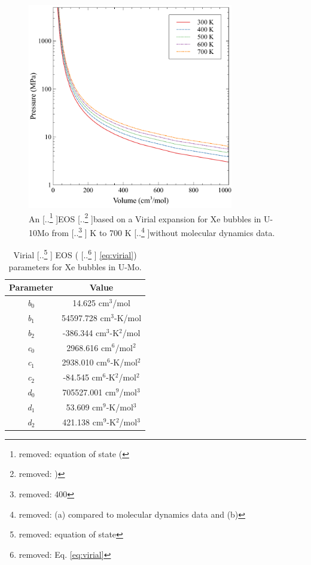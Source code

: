 \documentclass[review]{elsarticle}
\providecommand{\DIFaddtex}[1]{{\protect\color{blue} \sf #1}} %
\providecommand{\DIFdeltex}[1]{{\protect\color{red} [..\footnote{removed: #1} ]}} %
\providecommand{\DIFaddFL}[1]{\DIFadd{#1}} %
\providecommand{\DIFdelFL}[1]{\DIFdel{#1}} %
\providecommand{\DIFaddbeginFL}{} %
\providecommand{\DIFaddendFL}{} %
\providecommand{\DIFdelbeginFL}{} %
\providecommand{\DIFdelendFL}{} %
\providecommand{\DIFadd}[1]{\texorpdfstring{\DIFaddtex{#1}}{#1}} %
\providecommand{\DIFdel}[1]{\texorpdfstring{\DIFdeltex{#1}}{}} %
\newcommand{\DIFscaledelfig}{0.5}
\newlength{\DIFdelgraphicswidth} %
\newlength{\DIFdelgraphicsheight} %
\newcommand{\DIFaddincludegraphics}[2][]{{\color{blue}\fbox{\DIFOincludegraphics[#1]{#2}}}} %
\newcommand{\DIFdelincludegraphics}[2][]{%
\sbox{\DIFdelgraphicsbox}{\DIFOincludegraphics[#1]{#2}}%
\settoboxwidth{\DIFdelgraphicswidth}{\DIFdelgraphicsbox} %
\settoboxtotalheight{\DIFdelgraphicsheight}{\DIFdelgraphicsbox} %
\scalebox{\DIFscaledelfig}{%
\parbox[b]{\DIFdelgraphicswidth}{\usebox{\DIFdelgraphicsbox}\\[-\baselineskip] \rule{\DIFdelgraphicswidth}{0em}}\llap{\resizebox{\DIFdelgraphicswidth}{\DIFdelgraphicsheight}{%
\setlength{\unitlength}{\DIFdelgraphicswidth}%
\begin{picture}(1,1)%
\thicklines\linethickness{2pt} %
{\color[rgb]{1,0,0}\put(0,0){\framebox(1,1){}}}%
{\color[rgb]{1,0,0}\put(0,0){\line( 1,1){1}}}%
{\color[rgb]{1,0,0}\put(0,1){\line(1,-1){1}}}%
\end{picture}%
}\hspace*{3pt}}} %
} %
\DeclareRobustCommand{\DIFaddbeginFL}{\DIFOaddbeginFL \let\includegraphics\DIFaddincludegraphics} %
\DeclareRobustCommand{\DIFaddendFL}{\DIFOaddendFL \let\includegraphics\DIFOincludegraphics} %
\DeclareRobustCommand{\DIFdelbeginFL}{\DIFOdelbeginFL \let\includegraphics\DIFdelincludegraphics} %
\DeclareRobustCommand{\DIFdelendFL}{\DIFOaddendFL \let\includegraphics\DIFOincludegraphics} %
\begin{document}
\begin{figure}[h!]
 \centering
 \DIFdelbeginFL %
\DIFdelendFL \DIFaddbeginFL \includegraphics[width=0.8\textwidth]{virial_fit} 
 \DIFaddendFL \caption{An \DIFdelbeginFL \DIFdelFL{equation of state (}\DIFdelendFL EOS \DIFdelbeginFL \DIFdelFL{) }\DIFdelendFL based on a Virial expansion for Xe bubbles in U-10Mo from \DIFdelbeginFL \DIFdelFL{400 }\DIFdelendFL \DIFaddbeginFL \DIFaddFL{300 }\DIFaddendFL K to 700 K \DIFdelbeginFL \DIFdelFL{(a) compared to molecular dynamics data and (b) }\DIFdelendFL without molecular dynamics data. }
 \label{fig:Vir}
\end{figure}

\begin{table}[h!]
\caption{Virial \DIFdelbeginFL \DIFdelFL{equation of state }\DIFdelendFL \DIFaddbeginFL \DIFaddFL{EOS }\DIFaddendFL (\DIFdelbeginFL \DIFdelFL{Eq. \ref{eq:virial}}\DIFdelendFL \DIFaddbeginFL \DIFaddFL{\cref{eq:virial}}\DIFaddendFL ) parameters for Xe bubbles in U-Mo.}
\label{tab:virial}
\begin{center}
\begin{tabular}{|c|c|}
     \hline
      Parameter & Value \\
     \hline
     \textit{b$_0$} & 14.625 cm$^3$/mol \\
     \textit{b$_1$} & 54597.728 cm$^3$-K/mol  \\
     \textit{b$_2$} & -386.344 cm$^3$-K$^2$/mol \\
     \textit{c$_0$} & 2968.616 cm$^6$/mol$^2$ \\
     \textit{c$_1$} & 2938.010 cm$^6$-K/mol$^2$  \\
     \textit{c$_2$} & -84.545 cm$^6$-K$^2$/mol$^2$ \\
     \textit{d$_0$} & 705527.001 cm$^9$/mol$^3$ \\
     \textit{d$_1$} & 53.609 cm$^9$-K/mol$^3$ \\
     \textit{d$_2$} & 421.138 cm$^9$-K$^2$/mol$^3$ \\
     \hline
\end{tabular}
\end{center}
\label{default}
\end{table}%
\end{document}
